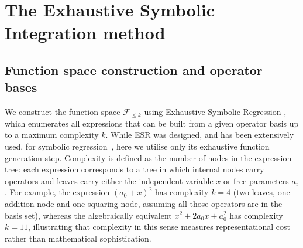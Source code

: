 \documentclass[preprint,12pt,authoryear]{elsarticle}
\newcommand{\Fleq}{\mathcal{F}_{\leq k}}
\newcommand{\hd}[1]{{\color{red}\textbf{[HD: #1]}}}
\begin{document}
\section{The Exhaustive Symbolic Integration method}
\label{sec:method}

\subsection{Function space construction and operator bases}
\label{sec:esr}

We construct the function space $\Fleq$ using Exhaustive Symbolic Regression \citep[ESR;][]{Bartlett2024}, which enumerates all expressions that can be built from a given operator basis up to a maximum complexity $k$. %
While ESR was designed, and has been extensively used, for symbolic regression~\citep{Bartlett2024,RAR,Inflation,Martin_1,Martin_2,Kronberger2024,Ford}, here we utilise only its exhaustive function generation step. Complexity is defined as the number of nodes in the expression tree: each expression corresponds to a tree
in which internal nodes carry operators and leaves carry either the independent variable $x$ or free parameters $a_i$. For example, the expression $(a_0 + x)^2$ has complexity $k = 4$ (two leaves, one addition node and one squaring node, assuming all those operators are in the basis set), whereas the algebraically equivalent $x^2 + 2a_0 x + a_0^2$ has complexity $k = 11$, illustrating that complexity in this sense measures representational cost rather than mathematical sophistication.
\end{document}
